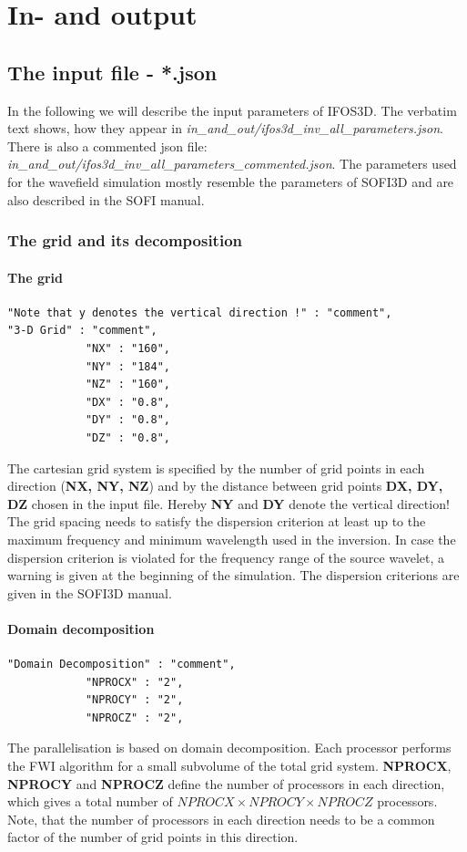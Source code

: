 \chapter{In- and output}
\section{The input file - *.json}
In the following we will describe the input parameters of IFOS3D. The verbatim text shows, how they appear in \textit{in\_and\_out/ifos3d\_inv\_all\_parameters.json}. There is also a commented json file: \textit{in\_and\_out/ifos3d\_inv\_all\_parameters\_commented.json}. The parameters used for the wavefield simulation mostly resemble the parameters of SOFI3D and are also described in the SOFI manual.
\subsection{The grid and its decomposition}
\subsubsection*{The grid}
\begin{verbatim}
"Note that y denotes the vertical direction !" : "comment",
"3-D Grid" : "comment",
			"NX" : "160",
			"NY" : "184",
			"NZ" : "160",
			"DX" : "0.8",
			"DY" : "0.8",
			"DZ" : "0.8",
\end{verbatim}
The cartesian grid system is specified by the number of grid points in each direction (\textbf{NX, NY, NZ}) and by the distance between grid points \textbf{DX, DY, DZ} chosen in the input file. Hereby \textbf{NY} and \textbf{DY} denote the vertical direction! 
The grid spacing needs to satisfy the dispersion criterion at least up to the maximum frequency and minimum wavelength used in the inversion. In case the dispersion criterion is violated for the frequency range of the source wavelet, a warning is given at the beginning of the simulation. The dispersion criterions are given in the SOFI3D manual.
\subsubsection*{Domain decomposition}
\begin{verbatim}
"Domain Decomposition" : "comment",
			"NPROCX" : "2",
			"NPROCY" : "2",
			"NPROCZ" : "2",
\end{verbatim}


The parallelisation is based on domain decomposition. Each processor performs the FWI algorithm for a small subvolume of the total grid system. \textbf{NPROCX}, \textbf{NPROCY} and \textbf{NPROCZ} define the number of processors in each direction, which gives a total number of $NPROCX\times NPROCY\times NPROCZ$ processors. Note, that the number of processors in each direction needs to be a common factor of the number of grid points in this direction.

